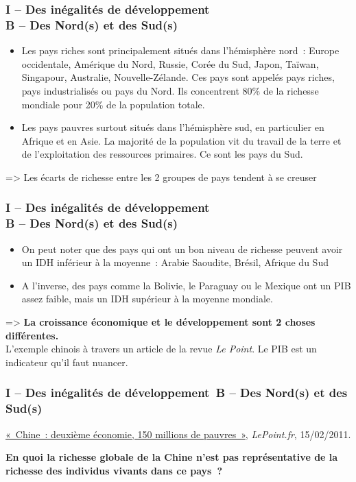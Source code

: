 \documentclass[C]{beamer}
\begin{document}
	\begin{frame}
	\frametitle{I -- Des inégalités de développement\\ B -- Des Nord(s) et des Sud(s)}
	\begin{itemize}
	\item Les pays riches sont principalement situés dans l'hémisphère nord~: Europe occidentale, Amérique du Nord, Russie, Corée du Sud, Japon, Taïwan, Singapour, Australie, Nouvelle-Zélande. Ces pays sont appelés pays riches, pays industrialisés ou pays du Nord. Ils concentrent 80\% de la richesse mondiale pour 20\% de la population totale.\\
\pause
	\item Les pays pauvres surtout situés dans l'hémisphère sud, en particulier en Afrique et en Asie. La majorité de la population vit du travail de la terre et de l'exploitation des ressources primaires. Ce sont les pays du Sud.
	\end{itemize}
=> Les écarts de richesse entre les 2 groupes de pays tendent à se creuser
	\end{frame}
	
	\begin{frame}
	\frametitle{I -- Des inégalités de développement\\ B -- Des Nord(s) et des Sud(s)}
	\begin{itemize}
	\item On peut noter que des pays qui ont un bon niveau de richesse peuvent avoir un IDH inférieur à la moyenne~: Arabie Saoudite, Brésil, Afrique du Sud\\
\pause
	\item A l'inverse, des pays comme la Bolivie, le Paraguay ou le Mexique ont un PIB assez faible, mais un IDH supérieur à la moyenne mondiale.
	\end{itemize}
=> \textbf{La croissance économique et le développement sont 2 choses différentes.}
\\
L'exemple chinois à travers un article de la revue \textit{Le Point}. Le PIB est un indicateur qu'il faut nuancer.
	\end{frame}
	
	\begin{frame}
	\frametitle{I -- Des inégalités de développement\s\ B -- Des Nord(s) et des Sud(s)}
	\href{run:ArticlePoint.pdf}{«~Chine~: deuxième économie, 150 millions de pauvres~»}, \textit{LePoint.fr}, 15/02/2011.\\
\pause
	\begin{center}
	\textbf{En quoi la richesse globale de la Chine n'est pas représentative de la richesse des individus vivants dans ce pays~?}
	\end{center}
	\end{frame}
	
\end{document}
